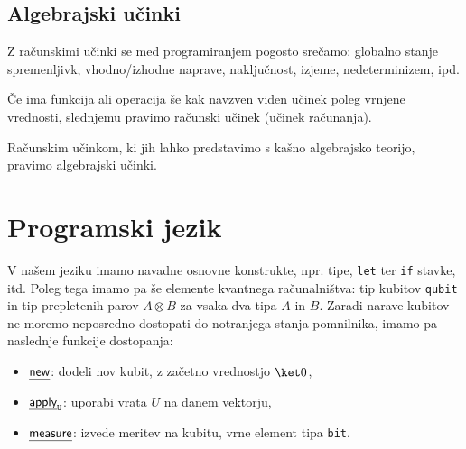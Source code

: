 \documentclass[a4paper,slovene]{article}
\begin{document}
\subsection{Algebrajski učinki}

Z računskimi učinki se med programiranjem pogosto srečamo: globalno stanje spremenljivk, vhodno/izhodne naprave, naključnost, izjeme, nedeterminizem, ipd.

\begin{definition}
    Če ima funkcija ali operacija še kak navzven viden učinek poleg vrnjene vrednosti, slednjemu pravimo računski učinek (učinek računanja).
\end{definition}

\begin{definition}
    Računskim učinkom, ki jih lahko predstavimo s kašno algebrajsko teorijo, pravimo algebrajski učinki.
\end{definition}


\section{Programski jezik}

V našem jeziku\cite{algeff-lin-qpl} imamo navadne osnovne konstrukte,
npr. tipe, \texttt{let} ter \texttt{if} stavke, itd.
Poleg tega imamo pa še elemente kvantnega računalništva:
tip kubitov \texttt{qubit} in tip prepletenih parov \( A⊗B \) za vsaka dva tipa \(A\) in \(B\).
Zaradi narave kubitov ne moremo neposredno dostopati do notranjega stanja pomnilnika,
imamo pa naslednje funkcije dostopanja:
\begin{itemize}
    \item \(\eff{new}\): dodeli nov kubit, z začetno vrednostjo \(\ket 0\),
    \item \(\eff{apply}_{\g U}\): uporabi vrata \(U\) na danem vektorju,
    \item \(\eff{measure}\): izvede meritev na kubitu, vrne element tipa \texttt{bit}.
\end{itemize}
\end{document}
